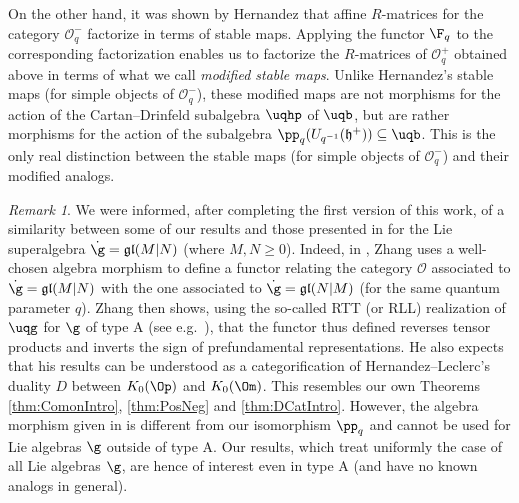 \documentclass[11pt]{amsart}
\theoremstyle{definition}
\theoremstyle{remark}
\newtheorem{rem}[theorem]{Remark}
\numberwithin{equation}{section}
\begin{document}
\par 
On the other hand, it was shown by Hernandez that affine $R$-matrices for the category $\mathcal{O}^-_{q}$ factorize in terms of stable maps. Applying the functor $\F_q$ to the corresponding factorization enables us to factorize the $R$-matrices of $\mathcal{O}_q^+$ obtained above in terms of what we call \textit{modified stable maps}. Unlike Hernandez's stable maps (for simple objects of $\mathcal{O}_q^-$), these modified maps are not morphisms for the action of the Cartan--Drinfeld subalgebra $\uqhp$ of $\uqb$, but are rather morphisms for the action of the subalgebra $\pp_q(U_{q^{-1}}(\mathfrak{h}^+))\subseteq \uqb$. This is the only real distinction between the stable maps (for simple objects of $\mathcal{O}_q^-$) and their modified analogs. \par
\begin{rem} 
We were informed, after completing the first version of this work, of a similarity between some of our results %
and those presented in \cite[Lemma 1.9]{z2} for the Lie superalgebra $\dot{\g}=\mathfrak{gl}(M|N)$ (where $M,N \geq 0$). Indeed, in \cite{z2}, Zhang uses a well-chosen algebra morphism to define a functor relating the category $\mathcal{O}$ associated to $\dot{\g}=\mathfrak{gl}(M|N)$ with the one associated to $\dot{\g}=\mathfrak{gl}(N|M)$ (for the same quantum parameter $q$). Zhang then shows, using the so-called RTT (or RLL) realization of $\uqg$ for $\g$ of type A (see e.g.~\cite{df,frt,z4}), that the functor thus defined reverses tensor products and inverts the sign of prefundamental representations. He also expects that his results can be understood as a categorification of Hernandez--Leclerc's duality $D$ between $K_0(\Op)$ and $K_0(\Om)$. This resembles our own Theorems \ref{thm:ComonIntro}, \ref{thm:PosNeg} and \ref{thm:DCatIntro}. However, the algebra morphism given in \cite{z2} is different from our isomorphism $\pp_q$ and cannot be used for Lie algebras $\g$ outside of type A. Our results, which treat uniformly the case of all Lie algebras $\g$, are hence of interest even in type A (and have no known analogs in general).
\end{rem}
\end{document}
